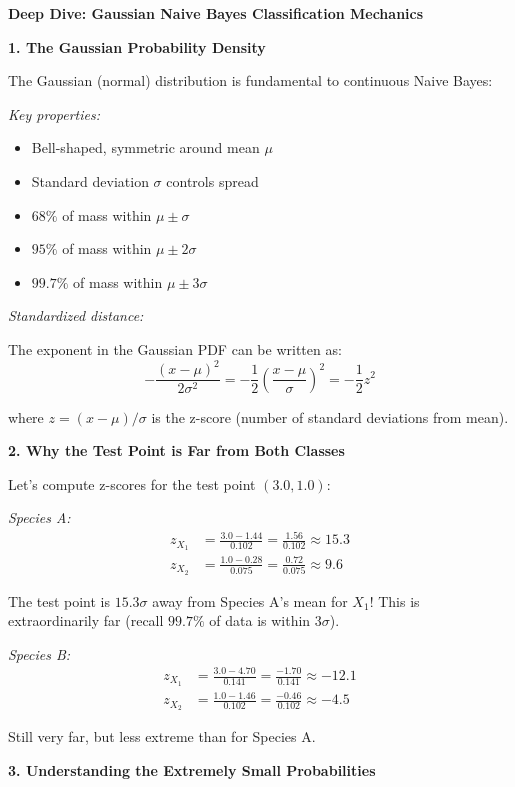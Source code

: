 \documentclass[12pt]{article}
\begin{document}
\begin{explanation}
\textbf{Deep Dive: Gaussian Naive Bayes Classification Mechanics}

\textbf{1. The Gaussian Probability Density}

The Gaussian (normal) distribution is fundamental to continuous Naive Bayes:

\textit{Key properties:}
\begin{itemize}
    \item Bell-shaped, symmetric around mean $\mu$
    \item Standard deviation $\sigma$ controls spread
    \item $68\%$ of mass within $\mu \pm \sigma$
    \item $95\%$ of mass within $\mu \pm 2\sigma$
    \item $99.7\%$ of mass within $\mu \pm 3\sigma$
\end{itemize}

\textit{Standardized distance:}

The exponent in the Gaussian PDF can be written as:
\[
-\frac{(x-\mu)^2}{2\sigma^2} = -\frac{1}{2}\left(\frac{x-\mu}{\sigma}\right)^2 = -\frac{1}{2}z^2
\]

where $z = (x-\mu)/\sigma$ is the z-score (number of standard deviations from mean).

\textbf{2. Why the Test Point is Far from Both Classes}

Let's compute z-scores for the test point $(3.0, 1.0)$:

\textit{Species A:}
\begin{align}
z_{X_1} &= \frac{3.0 - 1.44}{0.102} = \frac{1.56}{0.102} \approx 15.3 \\
z_{X_2} &= \frac{1.0 - 0.28}{0.075} = \frac{0.72}{0.075} \approx 9.6
\end{align}

The test point is $15.3\sigma$ away from Species A's mean for $X_1$! This is extraordinarily far (recall $99.7\%$ of data is within $3\sigma$).

\textit{Species B:}
\begin{align}
z_{X_1} &= \frac{3.0 - 4.70}{0.141} = \frac{-1.70}{0.141} \approx -12.1 \\
z_{X_2} &= \frac{1.0 - 1.46}{0.102} = \frac{-0.46}{0.102} \approx -4.5
\end{align}

Still very far, but less extreme than for Species A.

\textbf{3. Understanding the Extremely Small Probabilities}


\end{explanation}
\end{document}
